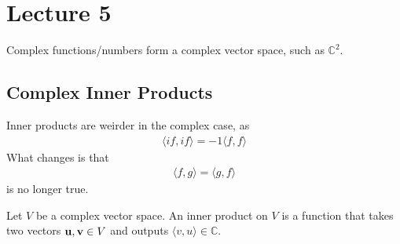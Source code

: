 \section{Lecture 5}
Complex functions/numbers form a complex vector space, such as $\mathbb{C}^2$. 
\subsection{Complex Inner Products}
Inner products are weirder in the complex case, as
\begin{align}
    \langle if, if \rangle = -1 \langle f, f \rangle
\end{align}
What changes is that
\begin{align}
    \langle f, g \rangle = \langle g, f \rangle
\end{align}
is no longer true.
\begin{definition}
    Let $V$ be a complex vector space. An inner product on $V$ is a function that takes two vectors $\vb{u}, \vb{v} \in V$ and outputs $\langle v, u \rangle \in \mathbb{C}$.
\end{definition}
